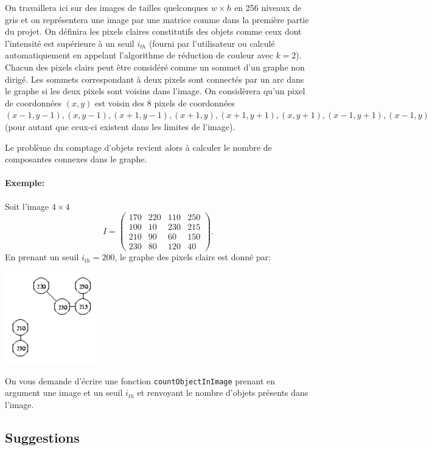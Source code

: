 \documentclass[a4paper,10pt]{article}
\begin{document}
On travaillera ici sur des images de tailles quelconques $w\times h$
en 256 niveaux de gris et on représentera une image par une matrice
comme dans la première partie du projet. On définira les pixels
claires constitutifs des objets comme ceux dont l'intensité est
supérieure à un seuil $i_{th}$ (fourni par l'utilisateur ou calculé
automatiquement en appelant l'algorithme de réduction de couleur avec
$k=2$). Chacun des pixels clairs peut être considéré comme un sommet
d'un graphe non dirigé. Les sommets correspondant à deux pixels sont
connectés par un arc dans le graphe si les deux pixels sont voisins
dans l'image. On considèrera qu'un pixel de coordonnées $(x,y)$ est
voisin des 8 pixels de coordonnées $(x-1,y-1), (x,y-1), (x+1,y-1),
(x+1,y), (x+1, y+1), (x,y+1), (x-1,y+1), (x-1,y)$ (pour autant que
ceux-ci existent dans les limites de l'image).

Le problème du comptage d'objets revient alors à calculer le nombre de
composantes connexes dans le graphe.

\paragraph{Exemple:} Soit l'image $4\times 4$
$$I=\left(\begin{matrix}
170&220&110&250\\
100&10&230&215\\
210&90&60&150\\
230&80&120&40
\end{matrix}\right).
$$
En prenant un seuil $i_{th}=200$, le graphe des pixels clairs est donné par:
\begin{center}
\includegraphics[width=4cm]{pict3.pdf}
\end{center}

On vous demande d'écrire une fonction \texttt{countObjectInImage}
prenant en argument une image et un seuil $i_{th}$ et renvoyant le nombre d'objets
présents dans l'image.

\subsection*{Suggestions}
\end{document}
